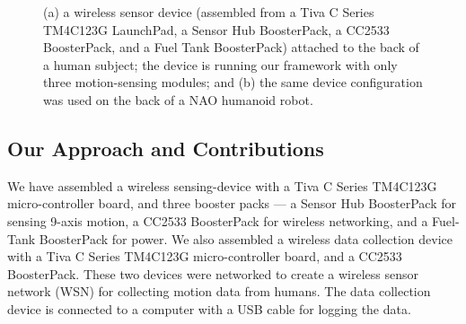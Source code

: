 \documentclass[]{IEEEtran}
\begin{document}
\begin{figure}[!tb]
\centering
{}
\qquad
{} 
\caption{(a) a wireless sensor device (assembled from a Tiva C Series  TM4C123G 
LaunchPad, a Sensor Hub BoosterPack, a CC2533 BoosterPack, and a Fuel Tank BoosterPack) 
attached to the back of a human subject; the device is running our framework  with only 
three motion-sensing modules; and (b) the 
same device configuration was used on the back of a NAO humanoid robot\cite{abeyruwanFlairs2015}.}
 \label{fig:deviceWithSubjects}
\end{figure}

\subsection{Our Approach and Contributions}
We have assembled a wireless sensing-device with a Tiva C Series TM4C123G
micro-controller board, and three booster packs --- a Sensor Hub BoosterPack  for
sensing 9-axis motion,  a CC2533  BoosterPack for wireless networking, and a
Fuel-Tank BoosterPack for power. We also assembled a wireless data collection
device with a Tiva C Series TM4C123G micro-controller board, and a  CC2533
BoosterPack. These two devices were networked to create a wireless sensor
network (WSN) for collecting motion data from  humans.  The data collection
device is connected to a computer with a USB cable for logging the data.   
\end{document}
